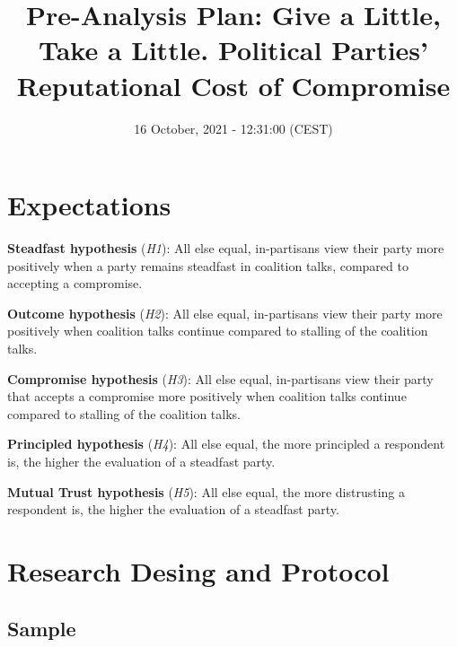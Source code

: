\documentclass[]{article}
\title{Pre-Analysis Plan: Give a Little, Take a Little. Political Parties'
Reputational Cost of Compromise}
\author{}
\date{\vspace{-2.5em}16 October, 2021 - 12:31:00 (CEST)}
\begin{document}
\maketitle

{
\hypersetup{linkcolor=}
\setcounter{tocdepth}{2}
\tableofcontents
}
\newpage

\hypertarget{expectations}{%
\section{Expectations}\label{expectations}}

\textbf{Steadfast hypothesis} (\emph{H1}): All else equal, in-partisans
view their party more positively when a party remains steadfast in
coalition talks, compared to accepting a compromise.

\textbf{Outcome hypothesis} (\emph{H2}): All else equal, in-partisans
view their party more positively when coalition talks continue compared
to stalling of the coalition talks.

\textbf{Compromise hypothesis} (\emph{H3}): All else equal, in-partisans
view their party that accepts a compromise more positively when
coalition talks continue compared to stalling of the coalition talks.

\textbf{Principled hypothesis} (\emph{H4}): All else equal, the more
principled a respondent is, the higher the evaluation of a steadfast
party.

\textbf{Mutual Trust hypothesis} (\emph{H5}): All else equal, the more
distrusting a respondent is, the higher the evaluation of a steadfast
party.

\hypertarget{research-desing-and-protocol}{%
\section{Research Desing and
Protocol}\label{research-desing-and-protocol}}

\hypertarget{sample}{%
\subsection{Sample}\label{sample}}
\end{document}
